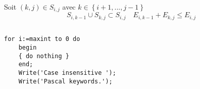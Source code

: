 \documentclass[french]{article}
\begin{document}
	\subsubsection{}
	Soit $\left(k,j\right)\in S_{i,j}$ avec $k\in\left\{ i+1,...,j-1\right\} $
	\[
	S_{i,k-1}\cup S_{k,j} \subset S_{i,j} \quad E_{i,k-1} + E_{k,j} \leq E_{i,j}
	\]

	\subsection{}
	
	\begin{lstlisting}[frame=single]  % Start your code-block
	for i:=maxint to 0 do
	begin
	{ do nothing }
	end;
	Write('Case insensitive ');
	Write('Pascal keywords.');
	\end{lstlisting}
\end{document}
